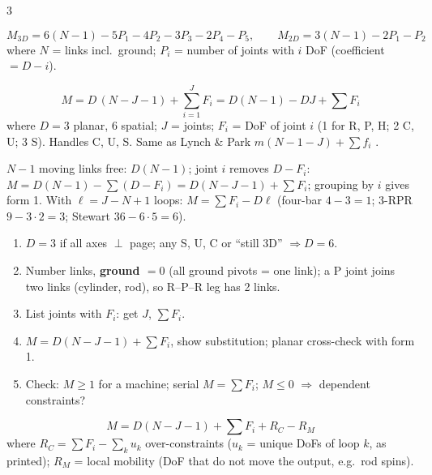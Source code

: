 \begin{multicols}{3}
\label{w1:gk}
\begin{fbx}[G--K, form 1 \pg{40}]
\[M_{3D}=6(N-1)-5P_1-4P_2-3P_3-2P_4-P_5,\qquad M_{2D}=3(N-1)-2P_1-P_2\]
where $N$ = links incl.\ ground; $P_i$ = number of joints with $i$ DoF (coefficient $=D-i$).
\end{fbx}
\begin{fbx}[G--K, form 2 \pg{41}: W13 Q6, Q7]
\[M=D\,(N-J-1)+\sum_{i=1}^{J}F_i=D(N-1)-DJ+\sum F_i\]
where $D=3$ planar, $6$ spatial; $J$ = joints; $F_i$ = DoF of joint $i$ (1 for R, P, H; 2 C, U; 3 S). Handles C, U, S. Same as Lynch \& Park $m(N-1-J)+\sum f_i$ \added.
\end{fbx}
\begin{deriv}
$N-1$ moving links free: $D(N-1)$; joint $i$ removes $D-F_i$: $M=D(N-1)-\sum(D-F_i)=D(N-J-1)+\sum F_i$; grouping by $i$ gives form 1. With $\ell=J-N+1$ loops: $M=\sum F_i-D\ell$ (four-bar $4-3=1$; 3-RPR $9-3\cdot2=3$; Stewart $36-6\cdot5=6$). \chk
\end{deriv}
\begin{recipe}
\begin{enumerate}
\item $D=3$ if all axes $\perp$ page; any S, U, C or ``still 3D'' $\Rightarrow D=6$.
\item Number links, \textbf{ground $=0$} (all ground pivots = one link); a P joint joins two links (cylinder, rod), so R--P--R leg has 2 links.
\item List joints with $F_i$: get $J$, $\sum F_i$.
\item $M=D(N-J-1)+\sum F_i$, show substitution; planar cross-check with form 1.
\item Check: $M\ge1$ for a machine; serial $M=\sum F_i$; $M\le0$ $\Rightarrow$ dependent constraints?
\end{enumerate}
\end{recipe}
\begin{fbx}[Extended G--K (W13 p.16; W4)]
\[M=D(N-J-1)+\sum F_i+R_C-R_M\]
where $R_C=\sum F_i-\sum_k u_k$ over-constraints ($u_k$ = unique DoFs of loop $k$, as printed); $R_M$ = local mobility (DoF that do not move the output, e.g.\ rod spins).
\end{fbx}
\begin{minipage}[t]{0.49\linewidth}\end{minipage}\hfill

\end{multicols}
